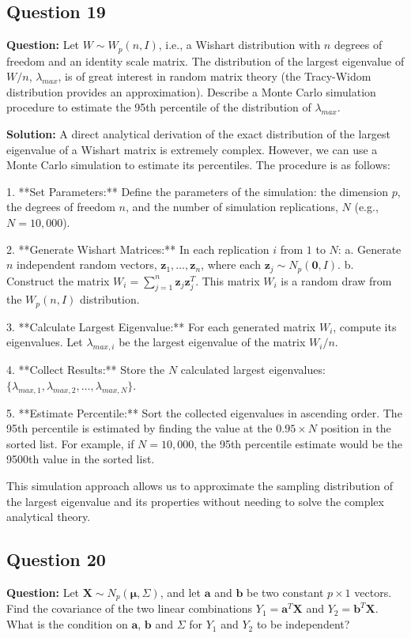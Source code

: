 \subsection*{Question 19}
\textbf{Question:} Let $W \sim W_p(n, I)$, i.e., a Wishart distribution with $n$ degrees of freedom and an identity scale matrix. The distribution of the largest eigenvalue of $W/n$, $\lambda_{max}$, is of great interest in random matrix theory (the Tracy-Widom distribution provides an approximation). Describe a Monte Carlo simulation procedure to estimate the 95th percentile of the distribution of $\lambda_{max}$.

\textbf{Solution:}
A direct analytical derivation of the exact distribution of the largest eigenvalue of a Wishart matrix is extremely complex. However, we can use a Monte Carlo simulation to estimate its percentiles. The procedure is as follows:

1.  **Set Parameters:** Define the parameters of the simulation: the dimension $p$, the degrees of freedom $n$, and the number of simulation replications, $N$ (e.g., $N=10,000$).

2.  **Generate Wishart Matrices:** In each replication $i$ from $1$ to $N$:
    a. Generate $n$ independent random vectors, $\mathbf{z}_1, \dots, \mathbf{z}_n$, where each $\mathbf{z}_j \sim N_p(\mathbf{0}, I)$.
    b. Construct the matrix $W_i = \sum_{j=1}^n \mathbf{z}_j \mathbf{z}_j^T$. This matrix $W_i$ is a random draw from the $W_p(n, I)$ distribution.

3.  **Calculate Largest Eigenvalue:** For each generated matrix $W_i$, compute its eigenvalues. Let $\lambda_{max, i}$ be the largest eigenvalue of the matrix $W_i/n$.

4.  **Collect Results:** Store the $N$ calculated largest eigenvalues: $\{\lambda_{max, 1}, \lambda_{max, 2}, \dots, \lambda_{max, N}\}$.

5.  **Estimate Percentile:** Sort the collected eigenvalues in ascending order. The 95th percentile is estimated by finding the value at the $0.95 \times N$ position in the sorted list. For example, if $N=10,000$, the 95th percentile estimate would be the 9500th value in the sorted list.

This simulation approach allows us to approximate the sampling distribution of the largest eigenvalue and its properties without needing to solve the complex analytical theory.

\subsection*{Question 20}
\textbf{Question:} Let $\mathbf{X} \sim N_p(\boldsymbol{\mu}, \Sigma)$, and let $\mathbf{a}$ and $\mathbf{b}$ be two constant $p \times 1$ vectors. Find the covariance of the two linear combinations $Y_1 = \mathbf{a}^T\mathbf{X}$ and $Y_2 = \mathbf{b}^T\mathbf{X}$. What is the condition on $\mathbf{a}$, $\mathbf{b}$ and $\Sigma$ for $Y_1$ and $Y_2$ to be independent?

